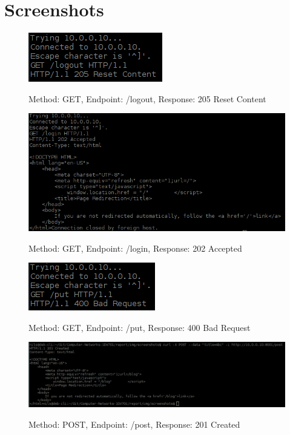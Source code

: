 \documentclass[a4paper,12pt]{article} %
\begin{document}
{\section{Screenshots}


\begin{figure}[H]
    \centering  
    \includegraphics[scale=1]{img/screenshots/response205logout.png}
	\label{fig:response205logout}
	\caption{Method: GET, Endpoint: /logout, Response: 205 Reset Content}
\end{figure}


\begin{figure}[H]
    \centering  
    \includegraphics[scale=0.6]{img/screenshots/response202login.png}
	\label{fig:response202login}
	\caption{Method: GET, Endpoint: /login, Response: 202 Accepted}
\end{figure}


\begin{figure}[H]
    \centering  
    \includegraphics[scale=1]{img/screenshots/response400put.png}
	\label{fig:response400put}
	\caption{Method: GET, Endpoint: /put, Response: 400 Bad Request}
\end{figure}


\begin{figure}[H]
    \centering  
    \includegraphics[scale=0.40]{img/screenshots/response201created.png}
	\label{fig:response201created}
	\caption{Method: POST, Endpoint: /post, Response: 201 Created}
\end{figure}


}
\end{document}
